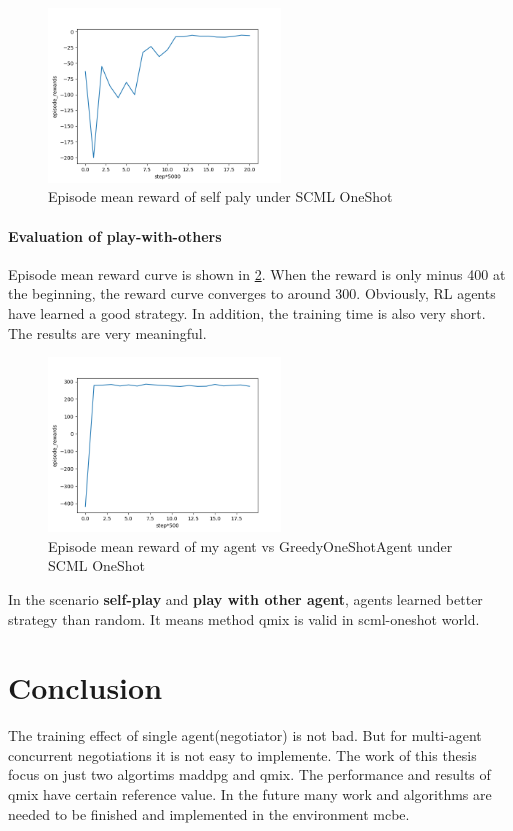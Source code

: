 \begin{figure}[htbp]
\centering
\includegraphics[width=0.55\textwidth]{./images/oneshot_self_play.png}
\caption{Episode mean reward of self paly under SCML OneShot}
\label{fig:oneshot-self-play}
\end{figure}

\paragraph{Evaluation of play-with-others}

Episode mean reward curve is shown in \ref{fig:oneshot-my-vs-greedy}. When the reward is only minus 400 at the beginning, the reward curve converges to around 300. Obviously, RL agents have learned a good strategy. In addition, the training time is also very short. The results are very meaningful.

\begin{figure}[htbp]
\centering
\includegraphics[width=0.55\textwidth]{./images/oneshot_my_vs_greedy.png}
\caption{Episode mean reward of my agent vs GreedyOneShotAgent under SCML OneShot}
\label{fig:oneshot-my-vs-greedy}
\end{figure}

In the scenario \textbf{self-play} and \textbf{play with other agent}, agents learned better strategy than random. It means method \gls{qmix} is valid in scml-oneshot world.

\section{Conclusion}
The training effect of single agent(negotiator) is not bad. But for multi-agent concurrent negotiations it is not easy to implemente. The work of this thesis focus on just two algortims \gls{maddpg} and \gls{qmix}. The performance and results of \gls{qmix} have certain reference value. In the future many work and algorithms are needed to be finished and implemented in the environment \gls{mcbe}.